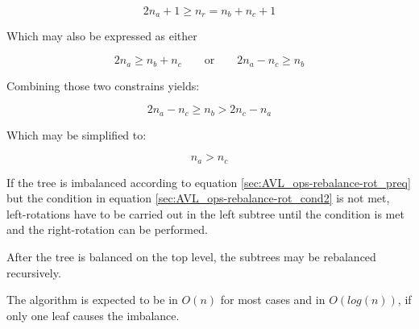         \begin{equation}
            2n_a + 1 \geq n_r = n_b + n_c + 1
            \label{sec:AVL_ops-rebalance-rot_cond1}
        \end{equation}

        Which may also be expressed as either

        \begin{equation}
            2n_a \geq n_b + n_c \qquad \mathrm{or} \qquad 2n_a - n_c \geq n_b
        \end{equation}

        Combining those two constrains yields:

        \begin{equation}
            2n_a - n_c \geq n_b > 2n_c -n_a
        \end{equation}

        Which may be simplified to:

        \begin{equation}
            n_a > n_c
            \label{sec:AVL_ops-rebalance-rot_cond2}
        \end{equation}

        If the tree is imbalanced according to equation
        \ref{sec:AVL_ops-rebalance-rot_preq} but the condition in equation
        \ref{sec:AVL_ops-rebalance-rot_cond2} is not met, left-rotations have to
        be carried out in the left subtree until the condition is met and the
        right-rotation can be performed.

        After the tree is balanced on the top level, the subtrees may be
        rebalanced recursively.

        The algorithm is expected to be in $O(n)$ for most cases and in
        $O(log(n))$, if only one leaf causes the imbalance.



